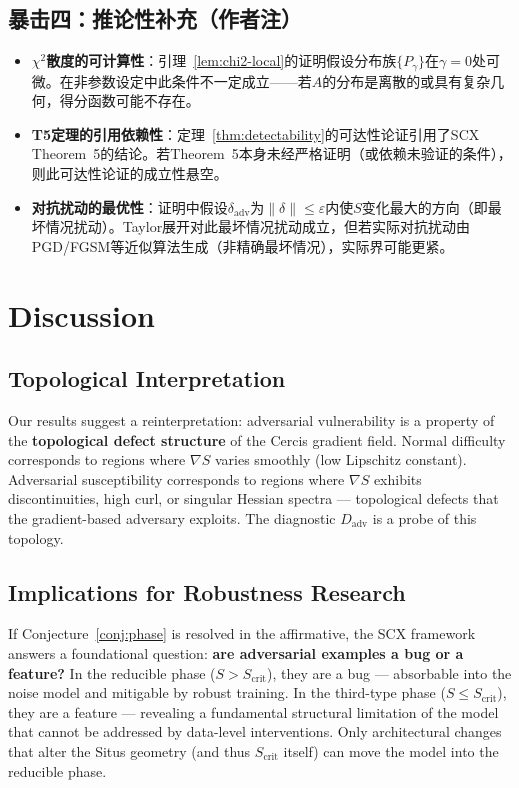 \documentclass[12pt,a4paper]{article}
\newcommand{\adv}{\mathrm{adv}}
\begin{document}
\subsection{暴击四：推论性补充（作者注）}
\label{crit:supplemental}

\begin{itemize}
  \item \textbf{$\chi^2$散度的可计算性}：引理~\ref{lem:chi2-local}的证明假设分布族$\{P_\gamma\}$在$\gamma=0$处可微。在非参数设定中此条件不一定成立——若$A$的分布是离散的或具有复杂几何，得分函数可能不存在。
  \item \textbf{T5定理的引用依赖性}：定理~\ref{thm:detectability}的可达性论证引用了SCX Theorem~5的结论。若Theorem~5本身未经严格证明（或依赖未验证的条件），则此可达性论证的成立性悬空。
  \item \textbf{对抗扰动的最优性}：证明中假设$\delta_{\adv}$为$\|\delta\| \leq \varepsilon$内使$S$变化最大的方向（即最坏情况扰动）。Taylor展开对此最坏情况扰动成立，但若实际对抗扰动由PGD/FGSM等近似算法生成（非精确最坏情况），实际界可能更紧。
\end{itemize}

\section{Discussion}

\subsection{Topological Interpretation}

Our results suggest a reinterpretation: adversarial vulnerability is a
property of the \textbf{topological defect structure} of the Cercis gradient
field.  Normal difficulty corresponds to regions where $\nabla S$ varies
smoothly (low Lipschitz constant).  Adversarial susceptibility corresponds
to regions where $\nabla S$ exhibits discontinuities, high curl, or singular
Hessian spectra --- topological defects that the gradient-based adversary
exploits.  The diagnostic $D_{\mathrm{adv}}$ is a probe of this topology.

\subsection{Implications for Robustness Research}

If Conjecture~\ref{conj:phase} is resolved in the affirmative, the SCX
framework answers a foundational question: \textbf{are adversarial examples a
bug or a feature?}  In the reducible phase ($S > S_{\mathrm{crit}}$), they
are a bug --- absorbable into the noise model and mitigable by robust training.
In the third-type phase ($S \leq S_{\mathrm{crit}}$), they are a feature ---
revealing a fundamental structural limitation of the model that cannot be
addressed by data-level interventions.  Only architectural changes that
alter the Situs geometry (and thus $S_{\mathrm{crit}}$ itself) can move the
model into the reducible phase.
\end{document}
